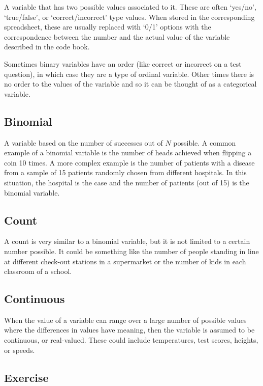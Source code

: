 \documentclass[
]{book}
\theoremstyle{definition}
\theoremstyle{definition}
\theoremstyle{definition}
\theoremstyle{definition}
\theoremstyle{remark}
\begin{document}
A variable that has two possible values associated to it. These are often `yes/no', `true/false', or `correct/incorrect' type values. When stored in the corresponding spreadsheet, these are usually replaced with `0/1' options with the correspondence between the number and the actual value of the variable described in the code book.

Sometimes binary variables have an order (like correct or incorrect on a test question), in which case they are a type of ordinal variable. Other times there is no order to the values of the variable and so it can be thought of as a categorical variable.

\hypertarget{binomial}{%
\subsection{Binomial}\label{binomial}}

A variable based on the number of successes out of \(N\) possible. A common example of a binomial variable is the number of heads achieved when flipping a coin 10 times. A more complex example is the number of patients with a disease from a sample of 15 patients randomly chosen from different hospitals. In this situation, the hospital is the case and the number of patients (out of 15) is the binomial variable.

\hypertarget{count}{%
\subsection{Count}\label{count}}

A count is very similar to a binomial variable, but it is not limited to a certain number possible. It could be something like the number of people standing in line at different check-out stations in a supermarket or the number of kids in each classroom of a school.

\hypertarget{continuous}{%
\subsection{Continuous}\label{continuous}}

When the value of a variable can range over a large number of possible values where the differences in values have meaning, then the variable is assumed to be continuous, or real-valued. These could include temperatures, test scores, heights, or speeds.

\hypertarget{exercise}{%
\subsection{Exercise}\label{exercise}}
\end{document}
